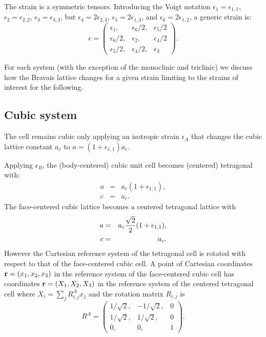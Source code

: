 \documentclass[12pt,a4paper]{article}
\begin{document}
The strain is a symmetric tensors. Introducing the Voigt notation 
$\epsilon_1=\epsilon_{1,1}$,
$\epsilon_2=\epsilon_{2,2}$, $\epsilon_3=\epsilon_{3,3}$, but
$\epsilon_4=2 \epsilon_{2,3}$, $\epsilon_5=2 \epsilon_{1,3}$, and
$\epsilon_6=2 \epsilon_{1,2}$, a generic strain is:
\begin{equation}
\epsilon=\left( \begin{array}{ccc}
\epsilon_1, & \epsilon_6/2, & \epsilon_5/2 
\\
\epsilon_6/2, & \epsilon_2, & \epsilon_4/2  
\\
\epsilon_5/2, & \epsilon_4/2, & \epsilon_{3}
\end{array}
\right).
\end{equation}

For each system (with the exception of the monoclinic and triclinic) 
we discuss how the Bravais lattice changes for a given strain limiting
to the strains of interest for the following.

\subsection{\color{web-blue}Cubic system}
The cell remains cubic only applying an isotropic strain $\epsilon_A$ that 
changes the cubic lattice constant $a_c$ to $a=(1+\epsilon_{1,1})a_c$.

Applying $\epsilon_B$, the (body-centered) cubic
unit cell becomes (centered) tetragonal with:
\begin{eqnarray}
a&=&a_c (1+\epsilon_{1,1}), \\
c&=&a_c.
\end{eqnarray}
The face-centered cubic lattice becomes a centered tetragonal lattice with
\begin{eqnarray}
a&=&a_c {\sqrt{2} \over 2} (1+\epsilon_{1,1}), \\
c&=&a_c.
\end{eqnarray}
However the Cartesian reference system of the tetragonal cell
is rotated with respect to that of the face-centered cubic cell. 
A point of Cartesian coordinates ${\bf r}=(x_1,x_2,x_3)$ 
in the reference system of the face-centered cubic cell 
has coordinates 
${\bf r}=(X_1,X_2,X_3)$ in the reference system of the centered tetragonal cell
where $X_i=\sum_j R^A_{i,j} x_j$ and the rotation matrix $R_{i,j}$ is 
\begin{equation}
R^A=\left( \begin{array}{ccc}
1/\sqrt{2}, & -1/\sqrt{2}, & 0 
\\
1/\sqrt{2}, & 1/\sqrt{2}, & 0 
\\
0, & 0, & 1
\end{array}
\right).
\end{equation}
\end{document}
